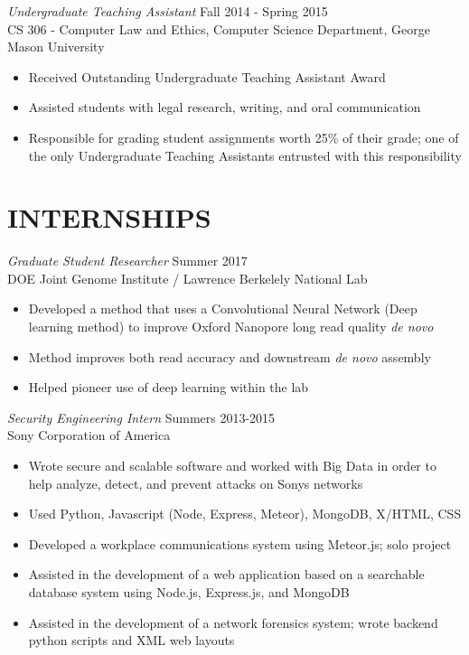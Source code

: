 \documentclass[margin, 10pt]{res} %
\begin{document}
\begin{resume}
{\sl Undergraduate Teaching Assistant} \hfill Fall 2014 - Spring 2015 \\
CS 306 - Computer Law and Ethics, Computer Science Department, George Mason University
\begin{itemize} \itemsep -2pt %
\item Received Outstanding Undergraduate Teaching Assistant Award 
\item Assisted students with legal research, writing, and oral communication
\item Responsible for grading student assignments worth 25\% of their grade; one of the only Undergraduate Teaching Assistants entrusted with this responsibility
\end{itemize} 


 
\section{INTERNSHIPS}

{\sl Graduate Student Researcher} \hfill Summer 2017 \\ DOE Joint Genome Institute / Lawrence Berkelely National Lab

\begin{itemize} \itemsep -2pt %
\item Developed a method that uses a Convolutional Neural Network (Deep learning method) to improve Oxford Nanopore long read quality \emph{de novo}
\item Method improves both read accuracy and downstream \emph{de novo} assembly
\item Helped pioneer use of deep learning within the lab
\end{itemize}


{\sl Security Engineering Intern} \hfill Summers 2013-2015 \\
Sony Corporation of America 

\begin{itemize} \itemsep -2pt %
\item Wrote secure and scalable software and worked with Big Data in order to help analyze, detect, and prevent attacks on Sony\textsc{}s networks
\item Used Python, Javascript (Node, Express, Meteor), MongoDB, X/HTML, CSS 
\item Developed a workplace communications system using Meteor.js; solo project
\item Assisted in the development of a web application based on a searchable database system using Node.js, Express.js, and MongoDB
\item Assisted in the development of a network forensics system; wrote backend python scripts and XML web layouts
\end{itemize} 



\end{resume}
\end{document}

